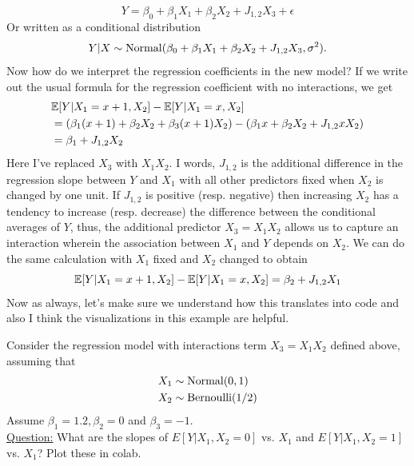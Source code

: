 \begin{equation*}
Y = \beta_0 + \beta_1 X_1 + \beta_2 X_2 + J_{1,2}X_3 + \epsilon
\end{equation*} 
Or written as a conditional distribution 
\begin{equation*}
Y|X \sim {\rm Normal}( \beta_0 + \beta_1 X_1 + \beta_2 X_2 + J_{1,2} X_3, \sigma^2). 
\end{equation*} 
 Now how do we interpret the regression coefficients in the new model? 
If we write out the usual formula for the regression coefficient with no interactions, we get 
\begin{align*}
 &\mathbb E[Y|X_1 = x+1,X_2] -\mathbb E[Y|X_1 = x,X_2]\\
 &  =  \left(\beta_1 (x+1)+ \beta_2 X_2 + \beta_3 (x+1)X_2\right)- \left(\beta_1 x + \beta_2 X_2 + J_{1,2} x X_2\right)\\
 &= \beta_1 + J_{1,2}X_2
\end{align*}
Here I've replaced $X_3$ with $X_1X_2$. I words, $J_{1,2}$ is the additional difference in the regression slope between $Y$ and $X_1$ with all other predictors fixed when $X_2$ is changed by one unit. 
If $J_{1,2}$ is positive (resp. negative) then increasing $X_2$ has a tendency to increase (resp. decrease) the difference between the conditional averages of $Y$, thus, the additional predictor $X_3 = X_1X_2$ allows us to capture an interaction wherein the association between $X_1$ and $Y$ depends on $X_2$. We can do the same calculation with $X_1$ fixed and $X_2$ changed to obtain 
\begin{equation*}
 \mathbb E[Y|X_1 = x+1,X_2] - \mathbb E[Y|X_1 = x,X_2] = \beta_2 + J_{1,2}X_1
\end{equation*}
Now as always, let's make sure we understand how this translates into code and also I think the visualizations in this example are helpful. 


\begin{example}
Consider the regression model with interactions term $X_3 = X_1X_2$ defined above, assuming that 
\begin{align*}
X_1 &\sim {\rm Normal}(0,1)\\
X_2 &\sim {\rm Bernoulli}(1/2)
\end{align*}
Assume $\beta_1 = 1.2,\beta_2 = 0$ and $\beta_3 =-1$. \\


\noindent
\underline{Question:} What are the slopes of $E[Y|X_1,X_2=0]$ vs. $X_1$ and $E[Y|X_1,X_2=1]$ vs. $X_1$? Plot these in colab. 


\end{example}

